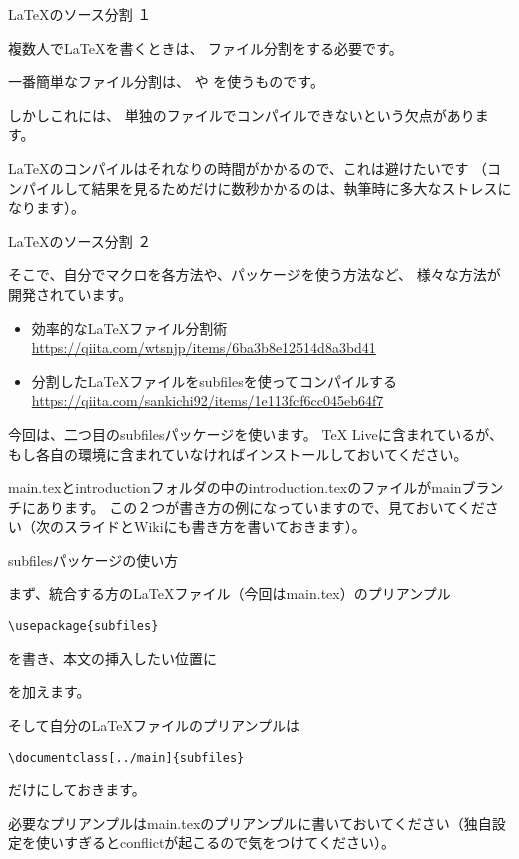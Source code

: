 \documentclass[12pt, unicode]{beamer}
\begin{document}
\begin{frame}[fragile]{\LaTeX のソース分割 １}

複数人でLaTeXを書くときは、
ファイル分割をする必要です。

一番簡単なファイル分割は、
\verb||
や
\verb||
を使うものです。

しかしこれには、
単独のファイルでコンパイルできないという欠点があります。

LaTeXのコンパイルはそれなりの時間がかかるので、これは避けたいです
（コンパイルして結果を見るためだけに数秒かかるのは、執筆時に多大なストレスになります）。

\end{frame}
\begin{frame}{\LaTeX のソース分割 ２}

そこで、自分でマクロを各方法や、パッケージを使う方法など、
様々な方法が開発されています。

\begin{itemize}
\item 効率的なLaTeXファイル分割術 \url{https://qiita.com/wtsnjp/items/6ba3b8e12514d8a3bd41}
\item 分割したLaTeXファイルをsubfilesを使ってコンパイルする　\url{https://qiita.com/sankichi92/items/1e113fcf6cc045eb64f7}
\end{itemize}

今回は、二つ目のsubfilesパッケージを使います。
TeX Liveに含まれているが、もし各自の環境に含まれていなければインストールしておいてください。

main.texとintroductionフォルダの中のintroduction.texのファイルがmainブランチにあります。
この２つが書き方の例になっていますので、見ておいてください（次のスライドとWikiにも書き方を書いておきます）。

\end{frame}
\begin{frame}[fragile]{subfilesパッケージの使い方}

まず、統合する方の\LaTeX ファイル（今回はmain.tex）のプリアンプル

\verb|\usepackage{subfiles}|

を書き、本文の挿入したい位置に

\verb||

を加えます。

そして自分の\LaTeX ファイルのプリアンプルは

\verb|\documentclass[../main]{subfiles}|

だけにしておきます。

必要なプリアンプルはmain.texのプリアンプルに書いておいてください（独自設定を使いすぎるとconflictが起こるので気をつけてください）。

\end{frame}
\end{document}
